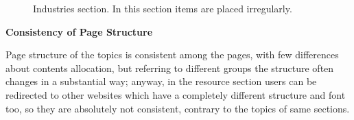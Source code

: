 \begin{figure}[H]
  \centering
    \caption{Industries section. In this section items are placed irregularly.}
    \label{space}
\end{figure}


\medskip
\textbf{Consistency of Page Structure}\par
Page structure of the topics is consistent among the pages, with few differences about contents allocation, but referring to different groups the structure often changes in a substantial way; anyway, in the resource section users can be redirected to other websites which have a completely different structure and font too, so they are absolutely not consistent, contrary to the topics of same sections.
\bigskip
\bigskip
\bigskip

